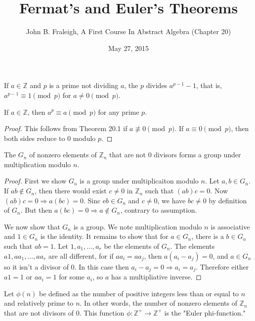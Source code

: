 \documentclass[a4paper,11pt]{article}
\title{Fermat's and Euler's Theorems}
\author{John B. Fraleigh, A First Course In Abstract Algebra (Chapter 20)}
\date{May 27, 2015}
\begin{document}
\maketitle
{}

\begin{outline}

    If \(a \in \mathbb{Z}\) and \(p\) is a prime not dividing \(a\),
    the \(p\) divides \(a^{p-1}-1\), that is, \(a^{p-1} \equiv 1 \pmod{p}\) for \(a \neq 0 \pmod{p}\).
      
    If \(a \in \mathbb{Z}\), then \(a^p \equiv a \pmod{p}\) for any prime \(p\).
    
    \begin{proof}
      This follows from Theorem 20.1 if \(a \not\equiv 0 \pmod{p}\). If \(a \equiv 0 \pmod{p}\), then
      both sides reduce to \(0\) modulo \(p\).
    \end{proof}
    
    The \(G_n\) of nonzero elements of \(\mathbb{Z}_n\) that are not \(0\) divisors forms a group
    under multiplication modulo \(n\).
    
    \begin{proof}
      First we show \(G_n\) is a group under multiplicaiton modulo \(n\). Let \(a, b \in G_n\). If \(ab \not\in G_n\),
      then there would exist \(c \neq 0\) in \(\mathbb{Z}_n\) such that \((ab)c = 0\). Now \((ab)c = 0 \Rightarrow a(bc)
      = 0\). Sinc e\(b \in G_n\) and \(c \neq 0\), we have \(bc \neq 0\) by definition of \(G_n\). But then \(a(bc) = 0
      \Rightarrow a \not\in G_n\), contrary to assumption.
      
      We now show that \(G_n\) is a group. We note multiplication modulo \(n\) is associative and \(1 \in G_n\) is the
      identity. It remains to show that for \(a \in G_n\), there is a \(b \in G_n\) such that \(ab = 1\). Let \(1, a_1,
      \ldots, a_r\) be the elements of \(G_n\). The elements \(a1, aa_1, \ldots, aa_r\) are all different, for if \(aa_i
      = aa_j\), then \(a(a_i-a_j) = 0\), and \(a \in G_n\) so it isn't a divisor of \(0\). In this case then \(a_i-a_j = 0
      \Rightarrow a_i = a_j\). Therefore either \(a1 = 1\) or \(aa_i = 1\) for some \(a_i\), so \(a\) has a multipliative
      inverse.
    \end{proof}
      
    Let \(\phi(n)\) be defined as the number of positive integers less than or equal to \(n\) and relatively prime 
    to \(n\). In other words, the number of nonzero elements of \(\mathbb{Z}_n\) that are not divisors 
    of \(0\). This function \(\phi: \mathbb{Z}^{+} \rightarrow \mathbb{Z}^{+}\) is the "Euler phi-function."


\end{outline}
\end{document}
